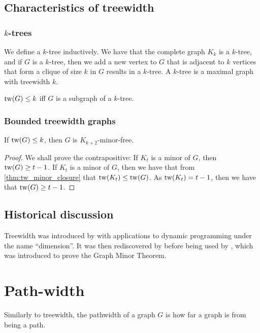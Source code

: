 \subsection{Characteristics of treewidth}\label{ssec:characterising_Treewidth}
\subsubsection{\(k\)-trees}\label{sssec:k-trees}
We define a \(k\)-tree inductively. We have that the complete graph \(K_k\) is a \(k\)-tree, and if \(G\) is a \(k\)-tree, then we add a new vertex to \(G\) that is adjacent to \(k\) vertices that form a clique of size \(k\) in \(G\) results in a \(k\)-tree.
A \(k\)-tree is a maximal graph with treewidth \(k\).
\begin{theorem}
	\(\operatorname{tw}(G) \leq k\) iff \(G\) is a subgraph of a \(k\)-tree.
\end{theorem}


\subsubsection{Bounded treewidth graphs}\label{sssec:Graph_treewidth_Bounded}
\begin{theorem}\label{thm:treewidth_clique-minor-free}
	If \(\operatorname{tw}(G) \leq k\), then \(G\) is \(K_{k+2}\)-minor-free.
\end{theorem}
\begin{proof}
	We shall prove the contrapositive: If \(K_t\) is a minor of \(G\), then \(\operatorname{tw}(G) \geq t-1\).
	If \(K_t\) is a minor of \(G\), then we have that from \cref{thm:tw_minor_closure} that \(\operatorname{tw}(K_t) \leq \operatorname{tw}(G)\). As \(\operatorname{tw}(K_t) = t-1\), then we have that \(\operatorname{tw}(G) \geq t - 1\).
\end{proof}

\subsection{Historical discussion}\label{ssec:tw_historical}
Treewidth was introduced by \textcite{berteleChapterEliminationVariables1972} with applications to dynamic programming under the name ``dimension''. It was then rediscovered by \textcite{halinSfunctionsGraphs1976} before being used by \textcite{robertsonGraphMinorsIII1984}, which was introduced to prove the Graph Minor Theorem\cite{robertsonGraphMinorsXX2004}.


\section{Path-width}\label{sec:Pathwidth}
Similarly to treewidth, the pathwidth of a graph \(G\) is how far a graph is from being a path.

